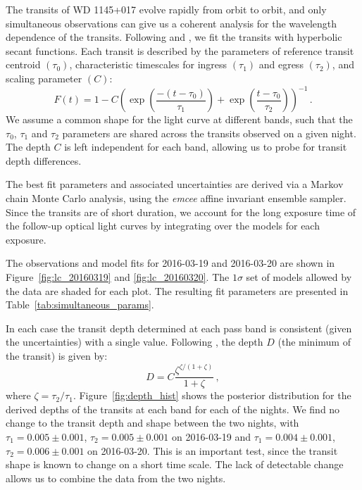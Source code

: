 \documentclass[apj]{emulateapj}
\begin{document}
The transits of WD 1145+017 evolve rapidly from orbit to orbit, and only simultaneous observations can give us a coherent analysis for the wavelength dependence of the transits. Following \citet{2014ApJ...784...40R} and \citet{2015arXiv151006434C}, we fit the transits with hyperbolic secant functions. Each transit is described by the parameters of reference transit centroid $(\tau_0)$, characteristic timescales for ingress $(\tau_1)$ and egress $(\tau_2)$, and scaling parameter $(C)$:
\begin{equation}
\label{eq:model}
  F(t) = 1 - C \left( \exp \left(\frac{-(t-\tau_0)}{\tau_1} \right) + \exp \left(\frac{t-\tau_0}{\tau_2} \right) \right)^{-1}\,.
\end{equation}
We assume a common shape for the light curve at different bands, such that the $\tau_0$, $\tau_1$ and $\tau_2$ parameters are shared across the transits observed on a given night. The depth $C$ is left independent for each band, allowing us to probe for transit depth differences.

The best fit parameters and associated uncertainties are derived via a Markov chain Monte Carlo analysis, using the \emph{emcee} \citep{2013PASP..125..306F} affine invariant ensemble sampler. Since the transits are of short duration, we account for the long exposure time of the follow-up optical light curves by integrating over the models for each exposure.

The observations and model fits for 2016-03-19 and 2016-03-20 are shown in Figure~\ref{fig:lc_20160319} and \ref{fig:lc_20160320}. The $1\sigma$ set of models allowed by the data are shaded for each plot. The resulting fit parameters are presented in Table~\ref{tab:simultaneous_params}. 

In each case the transit depth determined at each pass band is consistent (given the uncertainties) with a single value. Following \citet{2015arXiv151006434C}, the depth $D$ (the minimum of the transit) is given by: 
\begin{equation}
D = C \frac{\zeta^{\zeta/(1+\zeta)} }{1+\zeta}\,,
\end{equation}
where $\zeta = \tau_2/\tau_1$. Figure~\ref{fig:depth_hist} shows the posterior distribution for the derived depths of the transits at each band for each of the nights. We find no change to the transit depth and shape between the two nights, with $\tau_1 = 0.005\pm0.001$, $\tau_2 = 0.005\pm0.001$ on 2016-03-19 and $\tau_1 = 0.004\pm0.001$, $\tau_2 = 0.006\pm0.001$ on 2016-03-20. This is an important test, since the transit shape is known to change on a short time scale. The lack of detectable change allows us to combine the data from the two nights. 
\end{document}
